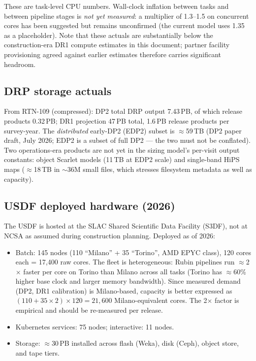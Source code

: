 These are task-level CPU numbers. Wall-clock inflation between tasks and
between pipeline stages is \emph{not yet measured}: a multiplier of 1.3--1.5
on concurrent cores has been suggested but remains unconfirmed (the current
model uses 1.35 as a placeholder). Note that these actuals are substantially
below the construction-era DR1 compute estimates in this document; partner
facility provisioning agreed against earlier estimates therefore carries
significant headroom.

\subsection{DRP storage actuals}\label{sec:ops2026storage}

From RTN-109 (compressed): DP2 total DRP output 7.43\,PB, of which release
products 0.32\,PB; DR1 projection 47\,PB total, 1.6\,PB release products per
survey-year. The \emph{distributed} early-DP2 (EDP2) subset is
$\approx$59\,TB (DP2 paper draft, July 2026; EDP2 is a subset of full DP2 ---
the two must not be conflated). Two operations-era products are not yet in the
sizing model's per-visit output constants: object Scarlet models (11\,TB at
EDP2 scale) and single-band HiPS maps ($\approx$18\,TB in $\sim$36M small
files, which stresses filesystem metadata as well as capacity).

\subsection{USDF deployed hardware (2026)}\label{sec:ops2026hw}

The USDF is hosted at the SLAC Shared Scientific Data Facility (S3DF), not at
NCSA as assumed during construction planning. Deployed as of 2026:

\begin{itemize}
\item Batch: 145 nodes (110 ``Milano'' + 35 ``Torino'', AMD EPYC class),
      120 cores each = 17{,}400 raw cores. The fleet is heterogeneous: Rubin
      pipelines run $\approx$2$\times$ faster per core on Torino than Milano
      across all tasks (Torino has $\approx$60\% higher base clock and larger
      memory bandwidth). Since measured demand (DP2, DR1 calibration) is
      Milano-based, capacity is better expressed as
      $(110 + 35\times2)\times120 = 21{,}600$ Milano-equivalent cores. The
      2$\times$ factor is empirical and should be re-measured per release.
\item Kubernetes services: 75 nodes; interactive: 11 nodes.
\item Storage: $\approx$30\,PB installed across flash (Weka), disk (Ceph),
      object store, and tape tiers.
\end{itemize}

